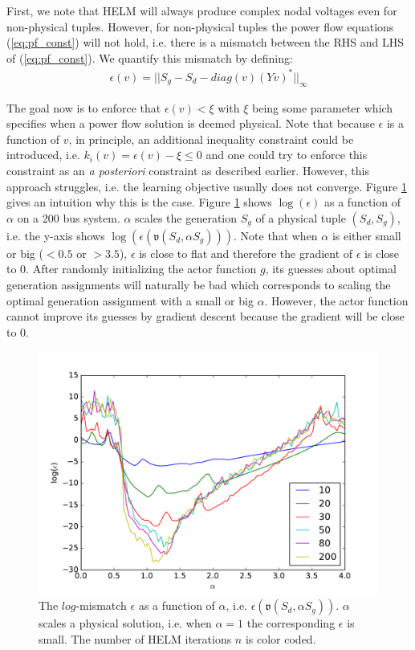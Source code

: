 First, we note that HELM will always produce complex nodal voltages even for non-physical tuples. However, for non-physical tuples the power flow equations (\ref{eq:pf_const}) will not hold, i.e. there is a mismatch between the RHS and LHS of (\ref{eq:pf_const}). We quantify this mismatch by defining: 
\begin{align*}
\epsilon(v) = ||S_{g} - S_{d} - diag(v)(Yv)^*||_\infty
\end{align*} 

The goal now is to enforce that $\epsilon(v) < \xi$ with $\xi$ being some parameter which specifies when a power flow solution is deemed physical. Note that because $\epsilon$ is a function of $v$, in principle, an additional inequality constraint could be introduced, i.e. $k_i(v) = \epsilon(v) - \xi \leq 0$ and one could try to enforce this constraint as an \emph{a posteriori} constraint as described earlier. However, this approach struggles, i.e. the learning objective usually does not converge. Figure \ref{fig:errors} gives an intuition why this is the case. Figure \ref{fig:errors} shows $\log(\epsilon)$ as a function of $\alpha$ on a 200 bus system. $\alpha$ scales the generation $S_g$ of a physical tuple $(S_d,S_g)$, i.e. the y-axis shows $\log(\epsilon(\mathfrak{v}(S_d,\alpha S_g)))$. Note that when $\alpha$ is either small or big ($<0.5$ or $>3.5$), $\epsilon$ is close to flat and therefore the gradient of $\epsilon$ is close to 0. After randomly initializing the actor function $g$, its guesses about optimal generation assignments will naturally be bad which corresponds to scaling the optimal generation assignment with a small or big $\alpha$. However, the actor function cannot improve its guesses by gradient descent because the gradient will be close to 0.

\begin{figure}
\includegraphics[width=\linewidth]{krtofl/error_phys.pdf}
\caption{The $log$-mismatch $\epsilon$ as a function of $\alpha$, i.e. $\epsilon(\mathfrak{v}(S_d,\alpha S_g))$. $\alpha$ scales a physical solution, i.e. when $\alpha = 1$ the corresponding $\epsilon$ is small. The number of HELM iterations $n$ is color coded.}
\label{fig:errors}
\end{figure}

